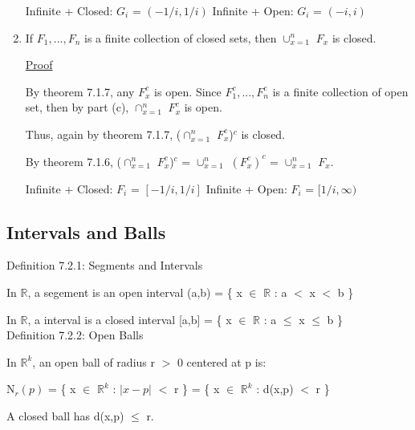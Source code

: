 \begin{enumerate}[label=(\alph*), leftmargin=2cm, itemsep=0.4em]
				{\color{purple} Infinite + Closed}: $G_i$ = $(-1/i,1/i)$
				\hfill
				{\color{purple} Infinite + Open}: $G_i$ = $(-i,i)$

		\item If $F_1, ... , F_n$ is a finite collection of closed sets,
		then $\cup_{x=1}^n$ $F_x$ is closed.

			{ \color{magenta} \underline{Proof} }

				By {\color{red} theorem 7.1.7}, any $F_x^c$ is open.
				Since $F_1^c, ... , F_n^c$ is a finite collection of
				open set, then by part (c), $\cap_{x=1}^n$ $F_x^c$ is open.

				Thus, again by {\color{red} theorem 7.1.7},
				($\cap_{x=1}^n$ $F_x^c$)$^c$ is closed.

				By {\color{red} theorem 7.1.6},
				($\cap_{x=1}^n$ $F_x^c$)$^c$ = $\cup_{x=1}^n$ $(F_x^c)^c$
				= $\cup_{x=1}^n$ $F_x$.

				\vspace{0.1cm}

				{\color{purple} Infinite + Closed}: $F_i$ = $[-1/i,1/i]$
				\hfill
				{\color{purple} Infinite + Open}: $F_i$ = $[1/i,\infty)$
	\end{enumerate}

\newpage





\subsection{ Intervals and Balls } 

{ \color{blue} Definition 7.2.1: Segments and Intervals } 

	\begin{adjustbox}{minipage=14cm, right, vspace=0.1cm 0cm}
		In $\mathbb{R}$, a {\color{lblue} segement} is an open interval
		(a,b) = \{ x $\in$ $\mathbb{R}$ : a $<$ x $<$ b \}

		In $\mathbb{R}$, a {\color{lblue} interval} is a closed interval
		[a,b] = \{ x $\in$ $\mathbb{R}$ : a $\leq$ x $\leq$ b \} \\
	\end{adjustbox}

{ \color{blue} Definition 7.2.2: Open Balls } 

	\begin{adjustbox}{minipage=14cm, right, vspace=0.1cm 0cm}
		In $\mathbb{R}^k$, an {\color{lblue} open ball} of radius
		r $>$ 0 centered at p is:

		\qquad N$_r(p)$ = \{ x $\in$ $\mathbb{R}^k$ : $|x-p|$ $<$ r \}
		= \{ x $\in$ $\mathbb{R}^k$ : d(x,p) $<$ r \}

		A {\color{lblue} closed ball} has d(x,p) $\leq$ r. \\
	\end{adjustbox}


